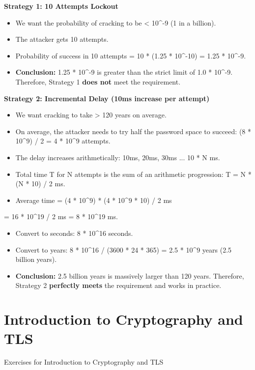 \documentclass{article}
\begin{document}
\textbf{Strategy 1: 10 Attempts Lockout}
\begin{itemize}
    \item We want the probability of cracking to be < 10\textasciicircum{}-9 (1 in a billion).
    \item The attacker gets 10 attempts.
    \item Probability of success in 10 attempts = 10 * (1.25 * 10\textasciicircum{}-10) = 1.25 * 10\textasciicircum{}-9.
    \item \textbf{Conclusion:} 1.25 * 10\textasciicircum{}-9 is greater than the strict limit of 1.0 * 10\textasciicircum{}-9. Therefore, Strategy 1 \textbf{does not} meet the requirement.

\end{itemize}
\textbf{Strategy 2: Incremental Delay (10ms increase per attempt)}
\begin{itemize}
    \item We want cracking to take > 120 years on average.
    \item On average, the attacker needs to try half the password space to succeed: (8 * 10\textasciicircum{}9) / 2 = 4 * 10\textasciicircum{}9 attempts.
    \item The delay increases arithmetically: 10ms, 20ms, 30ms ... 10 * N ms.
    \item Total time T for N attempts is the sum of an arithmetic progression: T = N * (N * 10) / 2 ms.
    \item Average time = (4 * 10\textasciicircum{}9) * (4 * 10\textasciicircum{}9 * 10) / 2 ms
\end{itemize}
= 16 * 10\textasciicircum{}19 / 2 ms = 8 * 10\textasciicircum{}19 ms.
\begin{itemize}
    \item Convert to seconds: 8 * 10\textasciicircum{}16 seconds.
    \item Convert to years: 8 * 10\textasciicircum{}16 / (3600 * 24 * 365) = 2.5 * 10\textasciicircum{}9 years (2.5 billion years).
    \item \textbf{Conclusion:} 2.5 billion years is massively larger than 120 years. Therefore, Strategy 2 \textbf{perfectly meets} the requirement and works in practice.
\end{itemize}


\section{Introduction to Cryptography and TLS}
Exercises for Introduction to Cryptography and TLS
\end{document}
